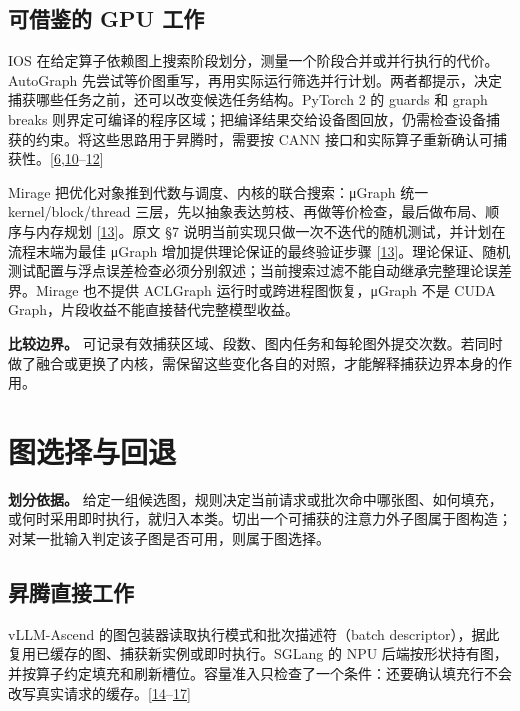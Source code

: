 \documentclass[
  UTF8,
  zihao=5]{ctexart}
\begin{document}
\hypertarget{ux53efux501fux9274ux7684-gpu-ux5de5ux4f5c}{%
\subsection{可借鉴的 GPU
工作}\label{ux53efux501fux9274ux7684-gpu-ux5de5ux4f5c}}

IOS
在给定算子依赖图上搜索阶段划分，测量一个阶段合并或并行执行的代价。AutoGraph
先尝试等价图重写，再用实际运行筛选并行计划。两者都提示，决定捕获哪些任务之前，还可以改变候选任务结构。PyTorch
2 的 guards 和 graph breaks
则界定可编译的程序区域；把编译结果交给设备图回放，仍需检查设备捕获的约束。将这些思路用于昇腾时，需要按
CANN
接口和实际算子重新确认可捕获性。{[}\protect\hyperlink{ref-cann910single}{6},\protect\hyperlink{ref-ding2021ios}{10}--\protect\hyperlink{ref-ansel2024pytorch2}{12}{]}

Mirage 把优化对象推到代数与调度、内核的联合搜索：μGraph 统一
kernel/block/thread
三层，先以抽象表达剪枝、再做等价检查，最后做布局、顺序与内存规划
{[}\protect\hyperlink{ref-wu2025mirage}{13}{]}。原文 §7
说明当前实现只做一次不迭代的随机测试，并计划在流程末端为最佳 μGraph
增加提供理论保证的最终验证步骤
{[}\protect\hyperlink{ref-wu2025mirage}{13}{]}。理论保证、随机测试配置与浮点误差检查必须分别叙述；当前搜索过滤不能自动继承完整理论误差界。Mirage
也不提供 ACLGraph 运行时或跨进程图恢复，μGraph 不是 CUDA
Graph，片段收益不能直接替代完整模型收益。

\textbf{比较边界。}
可记录有效捕获区域、段数、图内任务和每轮图外提交次数。若同时做了融合或更换了内核，需保留这些变化各自的对照，才能解释捕获边界本身的作用。

\hypertarget{selection}{%
\section{图选择与回退}\label{selection}}

\textbf{划分依据。}
给定一组候选图，规则决定当前请求或批次命中哪张图、如何填充，或何时采用即时执行，就归入本类。切出一个可捕获的注意力外子图属于图构造；对某一批输入判定该子图是否可用，则属于图选择。

\hypertarget{ux6607ux817eux76f4ux63a5ux5de5ux4f5c-1}{%
\subsection{昇腾直接工作}\label{ux6607ux817eux76f4ux63a5ux5de5ux4f5c-1}}

vLLM-Ascend 的图包装器读取执行模式和批次描述符（batch
descriptor），据此复用已缓存的图、捕获新实例或即时执行。SGLang 的 NPU
后端按形状持有图，并按算子约定填充和刷新槽位。容量准入只检查了一个条件：还要确认填充行不会改写真实请求的缓存。{[}\protect\hyperlink{ref-vllmascenddesign}{14}--\protect\hyperlink{ref-sglang2026impl}{17}{]}
\end{document}
